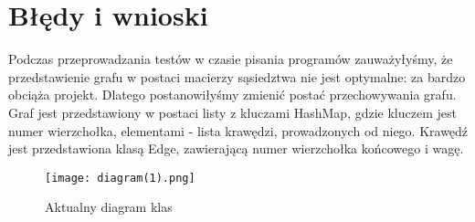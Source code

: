 \documentclass[]{article}
\begin{document}
\section{Błędy i wnioski}\label{header-n233}

Podczas przeprowadzania testów w czasie pisania programów zauważyłyśmy, że przedstawienie grafu w postaci macierzy sąsiedztwa nie jest optymalne: za bardzo obciąża projekt. Dlatego postanowiłyśmy zmienić postać przechowywania grafu. Graf jest przedstawiony w postaci listy z kluczami HashMap, gdzie kluczem jest numer wierzchołka, elementami - lista krawędzi, prowadzonych od niego. Krawędź jest przedstawiona klasą Edge, zawierającą numer wierzchołka końcowego i wagę. 


\begin{figure}[H]
\begin{center}
  \texttt{[image: diagram(1).png]}
  \end{center}
  \caption{Aktualny diagram klas}
  \label{fig:graf}
\end{figure}
\end{document}
